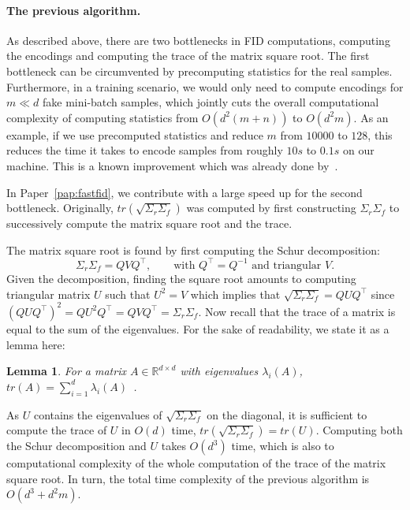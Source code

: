 \documentclass[11pt,a4paper,twoside,openright,final]{memoir}
\newtheorem{lemma}{Lemma}
\newcommand*{\paperref}[1]{Paper~\hyperref[#1]{\ref{#1}}}
\begin{document}
\paragraph{The previous algorithm.} As described above, there are two bottlenecks in FID computations, computing the encodings and computing the trace of the matrix square root.
The first bottleneck can be circumvented by precomputing statistics for the real samples.
Furthermore, in a training scenario, we would only need to compute encodings for $m \ll d$ fake mini-batch samples, which jointly cuts the overall computational complexity of computing statistics from $O(d^2(m+n))$ to $O(d^2m)$.
As an example, if we use precomputed statistics and reduce $m$ from $10 000$ to $128$, this reduces the time it takes to encode samples from roughly $10s$ to $0.1s$ on our machine.
This is a known improvement which was already done by~\cite{fid}.

In \paperref{pap:fastfid}, we contribute with a large speed up for the second bottleneck.
Originally, $tr( \sqrt{\Sigma_r \Sigma_f} )$ was computed by first constructing $\Sigma_r \Sigma_f$ to successively compute the matrix square root and the trace.

The matrix square root is found by first computing the Schur decomposition:
\begin{equation}\label{eq:schur}
    \Sigma_r\Sigma_f = QVQ^\intercal, \qquad \text{with }Q^\intercal = Q^{-1}\text{ and triangular }V.
\end{equation}
Given the decomposition, finding the square root amounts to computing triangular matrix $U$ such that $U^2 = V$ which implies that $\sqrt{\Sigma_r \Sigma_f} = QUQ^\intercal$ since $(QUQ^\intercal)^2 = QU^2Q^\intercal = QVQ^\intercal = \Sigma_r\Sigma_f$.
Now recall that the trace of a matrix is equal to the sum of the eigenvalues.
For the sake of readability, we state it as a lemma here:
\begin{lemma}\label{lem:trase-eigenvalues}
    For a matrix $A\in\mathbb{R}^{d\times d}$ with eigenvalues $\lambda_i(A)$, $tr(A) = \sum_{i=1}^{d}\lambda_i(A)$~\cite{matrix-cookbook}.
\end{lemma}
As $U$ contains the eigenvalues of $\sqrt{\Sigma_r\Sigma_f}$ on the diagonal, it is sufficient to compute the trace of $U$ in $O(d)$ time, $tr(\sqrt{\Sigma_r\Sigma_f}) = tr(U)$.
Computing both the Schur decomposition and $U$ takes $O(d^3)$ time, which is also to computational complexity of the whole computation of the trace of the matrix square root.
In turn, the total time complexity of the previous algorithm is $O(d^3 + d^2m)$.
\end{document}
